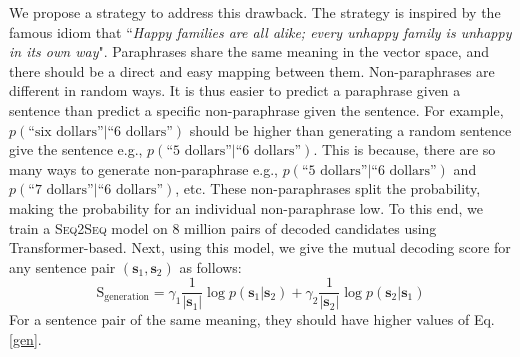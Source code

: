 \documentclass[11pt,a4paper]{article}
\newcommand{\sts}{{{\textsc{Seq2Seq}}}\xspace}
\begin{document}
We propose a strategy to address this drawback. 
The strategy is  inspired by the famous idiom that 
 ``{\it Happy families are all alike; every unhappy family is unhappy in its own way}".
 Paraphrases share the same meaning in the vector space, and there should be a direct and easy mapping between them.  
 Non-paraphrases are different in random ways.
 It is thus easier to predict a paraphrase given a sentence than predict a specific non-paraphrase given the sentence. 
For example,  
  $p(\text{``six dollars''} | \text{``6 dollars''})$
should be higher than generating a random sentence give the sentence
e.g., $p(\text{``5 dollars''} | \text{``6 dollars''})$. 
This is because, there are so many ways to generate  non-paraphrase 
e.g., $p(\text{``5 dollars''} | \text{``6 dollars''})$ and $p(\text{``7 dollars''} | \text{``6 dollars''})$, etc. 
These non-paraphrases split the probability, making the probability for an individual non-paraphrase  low. 
To this end, we train a \sts model \citep{sutskever2014sequence} on 
8 million
 pairs of decoded candidates using Transformer-based. 
Next, using this  model, we give the mutual decoding score for any sentence pair $(\bm{s}_1, \bm{s}_2)$ as follows:
\begin{equation}
\text{S}_{\text{generation}}= \gamma_1\frac{1}{|\bm{s}_1|}\log p(\bm{s}_1|\bm{s}_2)+\gamma_2\frac{1}{|\bm{s}_2|}\log p(\bm{s}_2|\bm{s}_1)
\label{gen}
\end{equation}
For  a sentence pair of the same meaning, they should have higher values of Eq.\ref{gen}.
\end{document}
